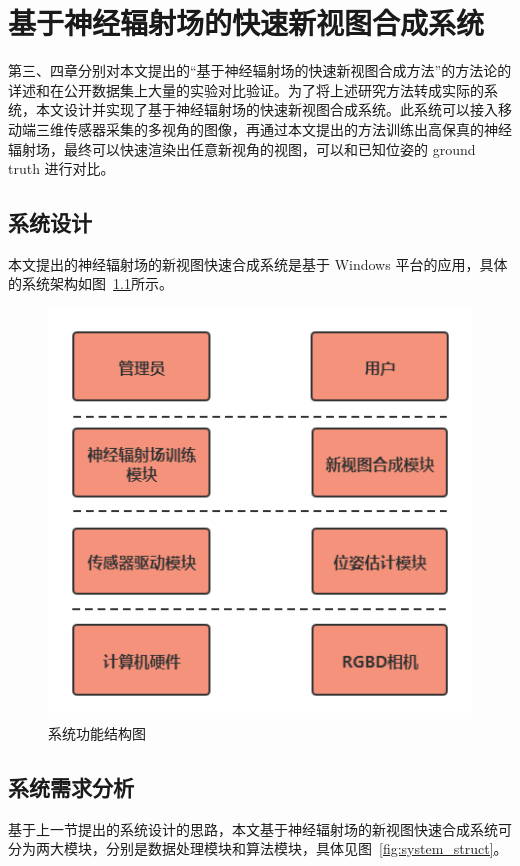 
\chapter{基于神经辐射场的快速新视图合成系统}\label{figures_tables}
第三、四章分别对本文提出的“基于神经辐射场的快速新视图合成方法”的方法论的详述和在公开数据集上大量的实验对比验证。为了将上述研究方法转成实际的系统，本文设计并实现了基于神经辐射场的快速新视图合成系统。此系统可以接入移动端三维传感器采集的多视角的图像，再通过本文提出的方法训练出高保真的神经辐射场，最终可以快速渲染出任意新视角的视图，可以和已知位姿的 ground truth 进行对比。

\section{系统设计}
本文提出的神经辐射场的新视图快速合成系统是基于 Windows 平台的应用，具体的系统架构如图~\ref{fig:symtem_design}所示。

\begin{figure}[htbp]
    \centering
    \includegraphics[width=0.75\linewidth, height=0.45\textheight]{figures/system_design.png}
    \caption{系统功能结构图}
    \label{fig:symtem_design}
\end{figure}

\section{系统需求分析}
基于上一节提出的系统设计的思路，本文基于神经辐射场的新视图快速合成系统可分为两大模块，分别是数据处理模块和算法模块，具体见图~\ref{fig:system_struct}。

